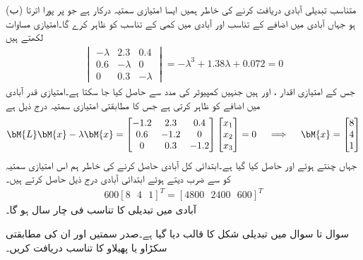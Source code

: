 (ب) متناسب تبدیلی آبادی دریافت کرنے کی خاطر ہمیں ایسا امتیازی سمتیہ  درکار ہے جو   پر پورا اترتا ہو جہاں  آبادی میں اضافے کے تناسب اور  آبادی میں کمی کے تناسب کو ظاہر کرے گا۔امتیازی مساوات لکھتے ہیں
\begin{align*}
\begin{vmatrix} -\lambda& 2.3&0.4\\0.6&-\lambda&0\\0&0.3&-\lambda \end{vmatrix}=-\lambda^3+1.38\lambda+0.072=0
\end{align*}
جس کے امتیازی اقدار ،  اور  ہیں جنہیں کمپیوٹر کی مدد سے حاصل کیا جا سکتا ہے۔امتیازی قدر  آبادی میں اضافے کو ظاہر کرتی ہے جس کا مطابقتی امتیازی سمتیہ درج ذیل ہے
\begin{align*}
\bM{L}\bM{x}-\lambda \bM{x}=\begin{bmatrix} -1.2&2.3&0.4\\0.6&-1.2&0\\0&0.3&-1.2 \end{bmatrix}\begin{bmatrix}x_1\\x_2\\x_3  \end{bmatrix}=0\quad \implies \quad \bM{x}=\begin{bmatrix} 8\\4\\1 \end{bmatrix}
\end{align*}
جہاں  چنتے ہوئے  اور  حاصل کیا گیا ہے۔ابتدائی کل آبادی  حاصل کرنے کی خاطر ہم اس امتیازی سمتیہ کو  سے ضرب دیتے ہوئے ابتدائی آبادی درج ذیل حاصل کرتے ہیں۔
\begin{align*}
600[8\,\,\,\,4\,\,\,\,1]^T=[4800\,\,\,\,2400\,\,\,\,600]^T
\end{align*}
 آبادی میں تبدیلی کا تناسب  فی  چار سال ہو گا۔

سوال  تا سوال  میں تبدیلی شکل  کا قالب  دیا گیا ہے۔صدر سمتیں اور ان کی مطابقتی سکڑاو یا پھیلاو کا تناسب دریافت کریں۔

